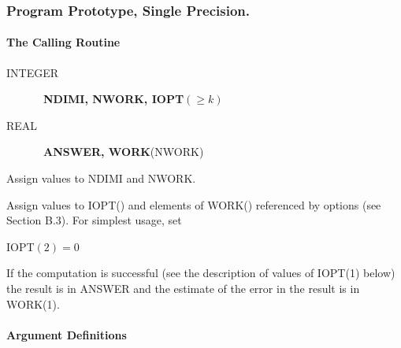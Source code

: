 \documentclass[twoside]{MATH77}
\begin{document}
\subsubsection{Program Prototype, Single Precision.\label{PPSP}}

\paragraph{The Calling Routine\label{Calling}}

\begin{description}
\item[INTEGER]  \ {\bf NDIMI, NWORK, IOPT}$(\geq k)$

\item[REAL]  \ {\bf ANSWER, WORK}(NWORK)
\end{description}

Assign values to NDIMI and NWORK.

Assign values to IOPT() and elements of WORK() referenced by options (see
Section B.3). For simplest usage, set

\hspace{.2in}IOPT$(2)=0$

\begin{center}
\end{center}

If the computation is successful (see the description of values of IOPT(1)
below) the result is in ANSWER and the estimate of the error in the result
is in WORK(1).

\paragraph{Argument Definitions\label{ArgDef}}
\end{document}
